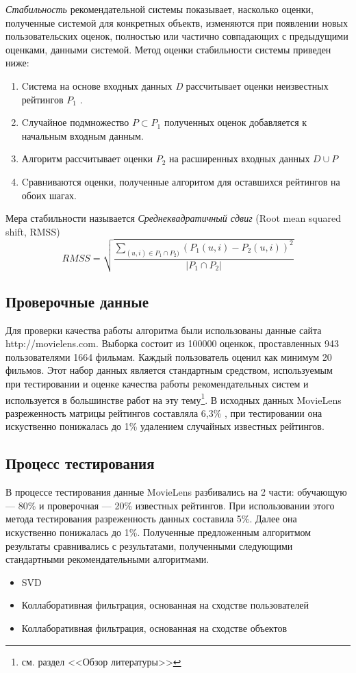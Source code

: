\documentclass[a4paper, 12pt]{article} %
\begin{document}
\par
\textit{Стабильность} рекомендательной системы показывает, насколько оценки, полученные системой для конкретных объектв, изменяются при появлении новых пользовательских оценок, полностью или частично совпадающих с предыдущими оценками, данными системой. Метод оценки стабильности системы приведен ниже:
\begin{enumerate}

\item Cистема  на основе входных данных \textit{D} рассчитывает оценки неизвестных рейтингов $P_{1}$ . 
\item Cлучайное подмножество $P \subset P_{1}$ полученных оценок добавляется к начальным входным данным. 
\item Алгоритм рассчитывает оценки $P_{2}$  на расширенных входных данных $D \cup P$ 
\item Cравниваются оценки, полученные алгоритом для оставшихся рейтингов на обоих шагах. 
\end{enumerate}
Мера стабильности называется \textit{Среднеквадратичный сдвиг} (Root mean squared shift, RMSS)
\[
	RMSS=\sqrt{\frac{\sum_{(u,i) \in P_{1} \cap P_{2})} (P_{1}(u,i) - P_{2}(u,i))^2}   {|P_{1} \cap P_{2}|}}
\]  

\subsection{Проверочные данные}
Для проверки качества работы алгоритма были использованы данные сайта\\ http://movielens.com. Выборка состоит из 100000 оценкок, проставленных  943 пользователями 1664 фильмам. Каждый пользователь оценил как минимум 20 фильмов. Этот набор данных является стандартным средством, используемым при тестировании и оценке качества работы рекомендательных систем и используется в большинстве работ на эту тему\footnote{см. раздел <<Обзор литературы>>}. В исходных данных MovieLens разреженность матрицы рейтингов составляла 6,3\% , при тестировании она искуственно понижалась до 1\% удалением случайных известных рейтингов.

\subsection{Процесс тестирования}
В процессе тестирования данные MovieLens разбивались на 2 части: обучающую --- 80\% и проверочная --- 20\% известных рейтингов. При использовании этого метода тестирования разреженность данных составила 5\%. Далее она искуственно понижалась до 1\%. Полученные предложенным алгоритмом результаты сравнивались с результатами, полученными следующими стандартными рекомендательными алгоритмами.
\begin{itemize}
\item SVD
\item Коллаборативная фильтрация, основанная на сходстве пользователей
\item Коллаборативная фильтрация, основанная на сходстве объектов
\end{itemize}
\end{document}
